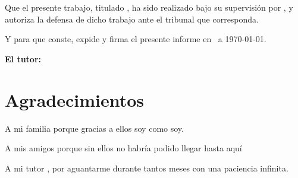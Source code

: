 \vspace{0.5cm}

Que el presente trabajo, titulado \textit{\textbf{\titulo}}, ha sido realizado bajo su supervisión por \textbf{\autor}, y 
autoriza la defensa de dicho trabajo ante el tribunal que corresponda.

\vspace{0.5cm}

Y para que conste, expide y firma el presente informe en \ciudad\ a \today.

\vspace{1cm}

\textbf{El tutor:}

\vspace{5cm}

\noindent \textbf{\tutor}

\chapter*{Agradecimientos}
\thispagestyle{empty}

\vspace{1cm}

A mi familia porque gracias a ellos soy como soy.

\bigskip
A mis amigos porque sin ellos no habría podido llegar hasta aquí

\bigskip
A mi tutor \textbf{\tutor}, por aguantarme durante tantos meses con una paciencia infinita.
